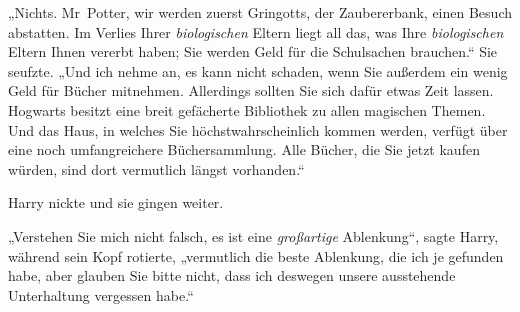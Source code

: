 „Nichts. Mr~Potter, wir werden zuerst Gringotts, der Zaubererbank, einen Besuch abstatten. Im Verlies Ihrer \emph{biologischen} Eltern liegt all das, was Ihre \emph{biologischen} Eltern Ihnen vererbt haben; Sie werden Geld für die Schulsachen brauchen.“ Sie seufzte.
„Und ich nehme an, es kann nicht schaden, wenn Sie außerdem ein wenig Geld für Bücher mitnehmen. Allerdings sollten Sie sich dafür etwas Zeit lassen. Hogwarts besitzt eine breit gefächerte Bibliothek zu allen magischen Themen. Und das Haus, in welches Sie höchstwahrscheinlich kommen werden, verfügt über eine noch umfangreichere Büchersammlung. Alle Bücher, die Sie jetzt kaufen würden, sind dort vermutlich längst vorhanden.“

Harry nickte und sie gingen weiter.

„Verstehen Sie mich nicht falsch, es ist eine \emph{großartige} Ablenkung“, sagte Harry, während sein Kopf rotierte, „vermutlich die beste Ablenkung, die ich je gefunden habe, aber glauben Sie bitte nicht, dass ich deswegen unsere ausstehende Unterhaltung vergessen habe.“


